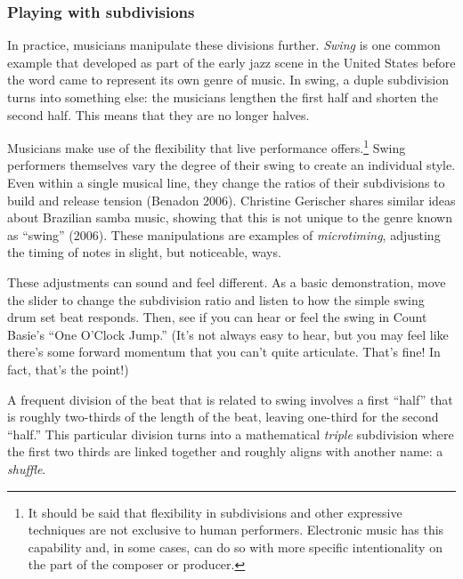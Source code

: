 \documentclass[twoside]{article}
\begin{document}
\hypertarget{example16}{}

\hypertarget{playing-with-subdivisions}{%
\subsubsection{Playing with
subdivisions}\label{playing-with-subdivisions}}

In practice, musicians manipulate these divisions further. \emph{Swing}
is one common example that developed as part of the early jazz scene in
the United States before the word came to represent its own genre of
music. In swing, a duple subdivision turns into something else: the
musicians lengthen the first half and shorten the second half. This
means that they are no longer halves.

Musicians make use of the flexibility that live performance
offers.\footnote{It should be said that flexibility in subdivisions and
  other expressive techniques are not exclusive to human performers.
  Electronic music has this capability and, in some cases, can do so
  with more specific intentionality on the part of the composer or
  producer.} Swing performers themselves vary the degree of their swing
to create an individual style. Even within a single musical line, they
change the ratios of their subdivisions to build and release tension
(Benadon 2006). Christine Gerischer shares similar ideas about Brazilian
samba music, showing that this is not unique to the genre known as
``swing'' (2006). These manipulations are examples of
\emph{microtiming}, adjusting the timing of notes in slight, but
noticeable, ways.

These adjustments can sound and feel different. As a basic
demonstration, move the slider to change the subdivision ratio and
listen to how the simple swing drum set beat responds. Then, see if you
can hear or feel the swing in Count Basie's ``One O'Clock Jump.'' (It's
not always easy to hear, but you may feel like there's some forward
momentum that you can't quite articulate. That's fine! In fact, that's
the point!)

\hypertarget{example17}{}

A frequent division of the beat that is related to swing involves a
first ``half'' that is roughly two-thirds of the length of the beat,
leaving one-third for the second ``half.'' This particular division
turns into a mathematical \emph{triple} subdivision where the first two
thirds are linked together and roughly aligns with another name: a
\emph{shuffle}.
\end{document}
